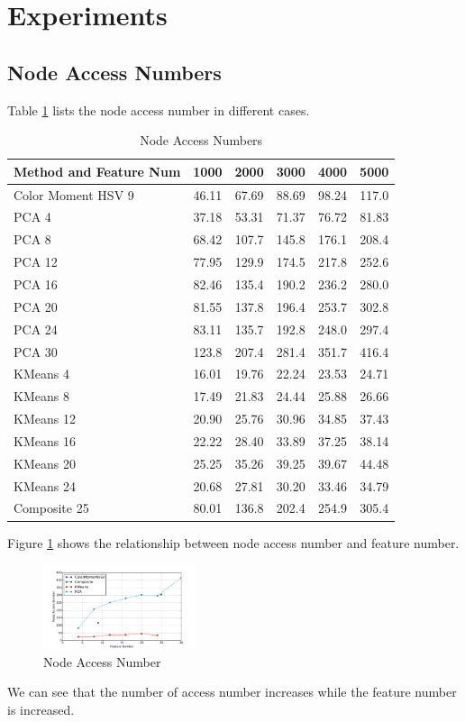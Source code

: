 \documentclass{acm_proc_article-sp}
\begin{document}
\section{Experiments}

\subsection{Node Access Numbers}
Table \ref{table:accessnum} lists the node access number in different cases.
\begin{table} \centering 
\begin{tabular}{|p{2.1cm}|c|c|c|c|c|}
    \hline
    Method and Feature Num & 1000 & 2000 & 3000 & 4000 & 5000 \\ \hline
    Color Moment HSV 9 & 46.11 & 67.69 & 88.69 & 98.24 & 117.0 \\ \hline
    PCA 4 & 37.18 & 53.31 & 71.37 & 76.72 & 81.83 \\ \hline
    PCA 8 & 68.42 & 107.7 & 145.8 & 176.1 & 208.4 \\ \hline
    PCA 12 & 77.95 & 129.9 & 174.5 & 217.8 & 252.6 \\ \hline
    PCA 16 & 82.46 & 135.4 & 190.2 & 236.2 & 280.0 \\ \hline
    PCA 20 & 81.55 & 137.8 & 196.4 & 253.7 & 302.8 \\ \hline
    PCA 24 & 83.11 & 135.7 & 192.8 & 248.0 & 297.4 \\ \hline
    PCA 30 & 123.8 & 207.4 & 281.4 & 351.7 & 416.4 \\ \hline
    KMeans 4 & 16.01 & 19.76 & 22.24 & 23.53 & 24.71 \\ \hline
    KMeans 8 & 17.49 & 21.83 & 24.44 & 25.88 & 26.66 \\ \hline
    KMeans 12 & 20.90 & 25.76 & 30.96 & 34.85 & 37.43 \\ \hline
    KMeans 16 & 22.22 & 28.40 & 33.89 & 37.25 & 38.14 \\ \hline
    KMeans 20 & 25.25 & 35.26 & 39.25 & 39.67 & 44.48 \\ \hline
    KMeans 24 & 20.68 & 27.81 & 30.20 & 33.46 & 34.79 \\ \hline
    Composite 25 & 80.01 & 136.8 & 202.4 & 254.9 & 305.4 \\ \hline
\end{tabular}
    \caption{Node Access Numbers}
    \label{table:accessnum}
\end{table}


Figure \ref{fig:accessnum} shows the relationship between node access number
    and feature number.
\begin{figure} \centering
    \includegraphics[width=0.4\textwidth]{data/accessnum.pdf}
    \caption{Node Access Number}
    \label{fig:accessnum}
\end{figure}
We can see that the number of access number increases while
    the feature number is increased.
\end{document}
